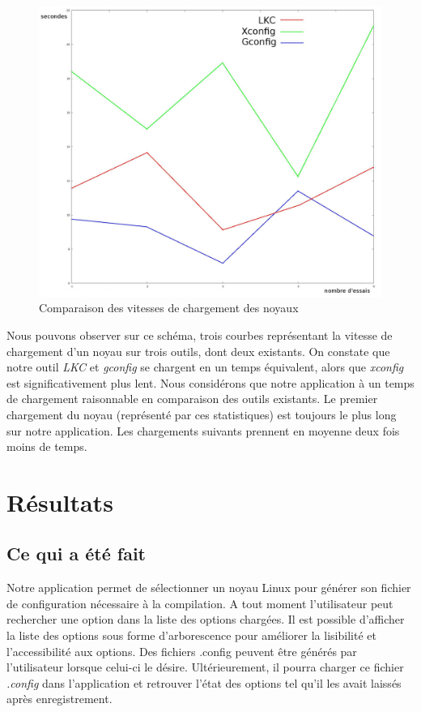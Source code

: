 ﻿\documentclass[17pts]{report}
\begin{document}
\begin{figure}[H]
    \includegraphics[scale=0.4]{./illustrations/speed_cmp.jpeg}
    \centering
    \caption{Comparaison des vitesses de chargement des noyaux}
    \label{fig:VitesseChargement}
\end{figure}
Nous pouvons observer sur ce schéma, trois courbes représentant la vitesse
de chargement d'un noyau sur trois outils, dont deux existants.
On constate que notre outil \textit{LKC} et \textit{gconfig} se chargent en un
temps équivalent, alors que \textit{xconfig} est significativement plus lent.
Nous considérons que notre application à un temps de chargement raisonnable
en comparaison des outils existants. Le premier chargement du noyau (représenté
par ces statistiques) est toujours le plus long sur notre application. Les
chargements suivants prennent en moyenne deux fois moins de temps.

\chapter{Résultats}\thispagestyle{IHA-fancy-style}
\label{cha:Résultats}
\section{Ce qui a été fait}
\label{sec:Ce qui a été fait}

Notre application permet de sélectionner un noyau Linux pour générer son
fichier de configuration nécessaire à la compilation. A tout moment
l'utilisateur peut rechercher une option dans la liste des options chargées. Il
est possible d'afficher la liste des options sous forme d'arborescence pour
améliorer la lisibilité et l'accessibilité aux options. Des fichiers .config
peuvent être générés par l'utilisateur lorsque celui-ci le désire.
Ultérieurement, il pourra charger ce fichier \textit{.config} dans
l'application et retrouver l'état des options tel qu'il les avait laissés après
enregistrement.\\
\end{document}
